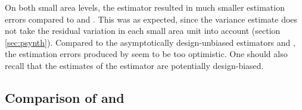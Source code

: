 On both small area levels, the \psynth{} estimator resulted in much smaller estimation errors compared to \psmall{} and \extpsynth{}. This was as expected, since the \psynth{} variance estimate does not take the residual variation in each small area unit into account (section \ref{sec:psynth}). Compared to the asymptotically design-unbiased estimators \psmall{} and \extpsynth{}, the estimation errors produced by \psynth{} seem to be too optimistic. One should also recall that the estimates of the \psynth{} estimator are potentially design-biased.





\subsection{Comparison of \psmall{} and \extpsynth{}}
\label{sec:comp}

